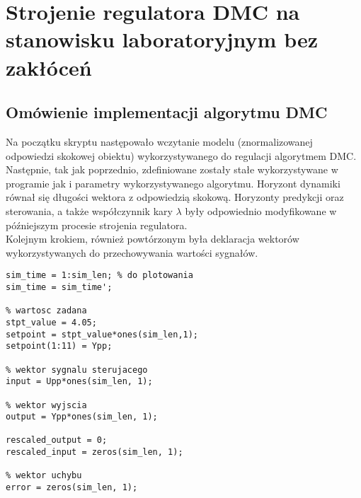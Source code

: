 

\chapter{Strojenie regulatora DMC na stanowisku laboratoryjnym bez zakłóceń}
\label{zad4_lab_opis}
\section{Omówienie implementacji algorytmu DMC}
Na początku skryptu następowało wczytanie modelu (znormalizowanej odpowiedzi skokowej obiektu) wykorzystywanego do regulacji algorytmem DMC.\\
\indent{} Następnie, tak jak poprzednio, zdefiniowane zostały stałe wykorzystywane w programie jak i parametry wykorzystywanego algorytmu. Horyzont dynamiki równał się długości wektora z odpowiedzią skokową. Horyzonty predykcji oraz sterowania, a także współczynnik kary $\lambda$ były odpowiednio modyfikowane w późniejszym procesie strojenia regulatora. \\
\indent{} Kolejnym krokiem, również powtórzonym była deklaracja wektorów wykorzystywanych do przechowywania wartości sygnałów.

\begin{lstlisting}[style=custommatlab,frame=single,label={zad4_vecDMC_lst},caption={Inizjalizacja wektorów używanych do przechowywania sygnałów.},captionpos=b]
% czas symulacji
sim_time = 1:sim_len; % do plotowania
sim_time = sim_time';

% wartosc zadana
stpt_value = 4.05;
setpoint = stpt_value*ones(sim_len,1);
setpoint(1:11) = Ypp;

% wektor sygnalu sterujacego
input = Upp*ones(sim_len, 1);

% wektor wyjscia
output = Ypp*ones(sim_len, 1);

rescaled_output = 0;
rescaled_input = zeros(sim_len, 1);

% wektor uchybu
error = zeros(sim_len, 1);

\end{lstlisting}

